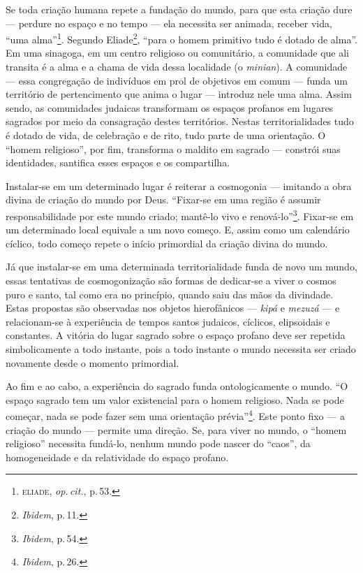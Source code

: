 Se toda criação humana repete a fundação do mundo, para que esta criação
dure --- perdure no espaço e no tempo --- ela necessita ser animada,
receber vida, ``uma alma''\footnote{\textsc{eliade}, \emph{op.\,cit.}, p.\,53.}. Segundo
Eliade\footnote{\emph{Ibidem}, p.\,11.}, ``para o homem primitivo tudo é
dotado de alma''. Em uma sinagoga, em um centro religioso ou
comunitário, a comunidade que ali transita é a alma e a chama de vida
dessa localidade (o \emph{minian}). A comunidade --- essa congregação de
indivíduos em prol de objetivos em comum --- funda um território de
pertencimento que anima o lugar --- introduz nele uma alma. Assim sendo,
as comunidades judaicas transformam os espaços profanos em lugares
sagrados por meio da consagração destes territórios. Nestas
territorialidades tudo é dotado de vida, de celebração e de rito, tudo
parte de uma orientação. O ``homem religioso'', por fim, transforma o
maldito em sagrado --- constrói suas identidades, santifica esses
espaços e os compartilha.

Instalar-se em um determinado lugar é reiterar a cosmogonia --- imitando
a obra divina de criação do mundo por Deus. ``Fixar-se em uma
região é assumir responsabilidade por este mundo criado; mantê-lo vivo e
renová-lo''\footnote{\emph{Ibidem}, p.\,54.}. Fixar-se em um determinado local
equivale a um novo começo. E, assim como um calendário cíclico, todo
começo repete o início primordial da criação divina do mundo.

Já que instalar-se em uma determinada territorialidade funda de novo um
mundo, essas tentativas de cosmogonização são formas de dedicar-se a
viver o cosmos puro e santo, tal como era no princípio, quando saiu das
mãos da divindade. Estas propostas são observadas nos objetos
hierofânicos --- \emph{kipá} e \emph{mezuzá} --- e relacionam-se à
experiência de tempos santos judaicos, cíclicos, elipsoidais e
constantes. A vitória do lugar sagrado sobre o espaço profano deve ser
repetida simbolicamente a todo instante, pois a todo instante o mundo
necessita ser criado novamente desde o momento primordial.

Ao fim e ao cabo, a experiência do sagrado funda ontologicamente o
mundo. ``O espaço sagrado tem um valor existencial para o homem
religioso. Nada se pode começar, nada se pode fazer sem uma orientação
prévia''\footnote{\emph{Ibidem}, p.\,26.}. Este ponto fixo --- a criação do
mundo --- permite uma direção. Se, para viver no mundo, o ``homem
religioso'' necessita fundá-lo, nenhum mundo pode nascer do ``caos'', da
homogeneidade e da relatividade do espaço profano.

